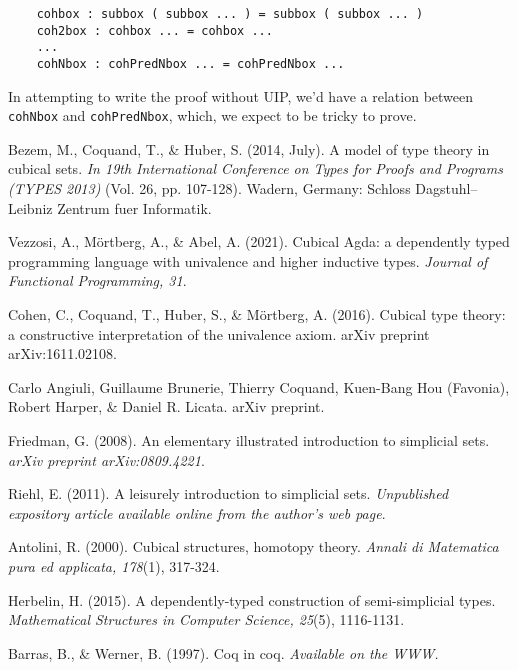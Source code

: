 \documentclass[10pt]{art}
\begin{document}
\begin{listing}[H]
  \begin{verbatim}
    cohbox : subbox ( subbox ... ) = subbox ( subbox ... )
    coh2box : cohbox ... = cohbox ...
    ...
    cohNbox : cohPredNbox ... = cohPredNbox ...
  \end{verbatim}
\end{listing}

In attempting to write the proof without UIP, we'd have a relation between \texttt{cohNbox} and \texttt{cohPredNbox}, which, we expect to be tricky to prove.

\newpage

\begin{thebibliography}{10}
  Bezem, M., Coquand, T., \& Huber, S. (2014, July). A model of type theory in cubical sets. \textit{In 19th International Conference on Types for Proofs and Programs (TYPES 2013)} (Vol. 26, pp. 107-128). Wadern, Germany: Schloss Dagstuhl–Leibniz Zentrum fuer Informatik.

  Vezzosi, A., Mörtberg, A., \& Abel, A. (2021). Cubical Agda: a dependently typed programming language with univalence and higher inductive types. \textit{Journal of Functional Programming, 31}.

  Cohen, C., Coquand, T., Huber, S., \& Mörtberg, A. (2016). Cubical type theory: a constructive interpretation of the univalence axiom. arXiv preprint arXiv:1611.02108.

  Carlo Angiuli, Guillaume Brunerie, Thierry Coquand, Kuen-Bang Hou (Favonia), Robert Harper, \& Daniel R. Licata. arXiv preprint.

  Friedman, G. (2008). An elementary illustrated introduction to simplicial sets. \textit{arXiv preprint arXiv:0809.4221}.

  Riehl, E. (2011). A leisurely introduction to simplicial sets. \textit{Unpublished expository article available online from the author's web page}.

  Antolini, R. (2000). Cubical structures, homotopy theory. \textit{Annali di Matematica pura ed applicata, 178}(1), 317-324.

  Herbelin, H. (2015). A dependently-typed construction of semi-simplicial types. \textit{Mathematical Structures in Computer Science, 25}(5), 1116-1131.

  Barras, B., \& Werner, B. (1997). Coq in coq. \textit{Available on the WWW.}
\end{thebibliography}
\end{document}
